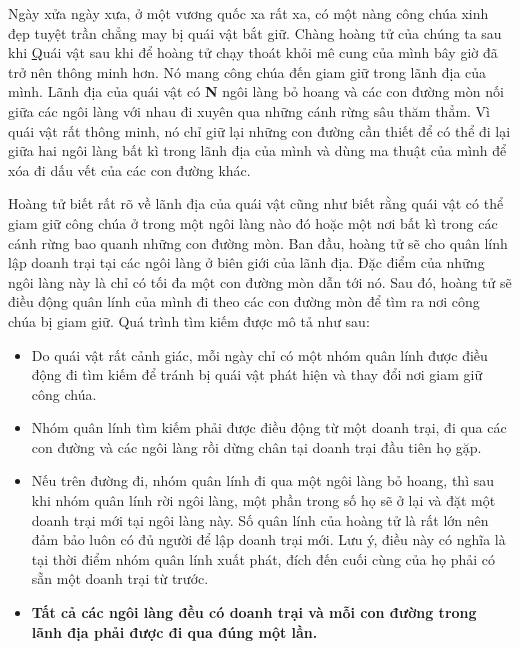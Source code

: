 

Ngày xửa ngày xưa, ở một vương quốc xa rất xa, có một nàng công chúa xinh đẹp tuyệt trần chẳng may bị quái vật bắt giữ. Chàng hoàng tử của chúng ta sau khi \href{vnoi.info/problems/show/VOBOARD2/{ thoát ra được mê cung } chưa bao lâu thì hay tin này và chàng ngay lập tức dẫn quân lính đi giải cứu công chúa. }

Quái vật sau khi để hoàng tử chạy thoát khỏi mê cung của mình bây giờ đã trở nên thông minh hơn. Nó mang công chúa đến giam giữ trong lãnh địa của mình. Lãnh địa của quái vật có \textbf{ N } ngôi làng bỏ hoang và các con đường mòn nối giữa các ngôi làng với nhau đi xuyên qua những cánh rừng sâu thăm thẳm. Vì quái vật rất thông minh, nó chỉ giữ lại những con đường cần thiết để có thể đi lại giữa hai ngôi làng bất kì trong lãnh địa của mình và dùng ma thuật của mình để xóa đi dấu vết của các con đường khác.

Hoàng tử biết rất rõ về lãnh địa của quái vật cũng như biết rằng quái vật có thể giam giữ công chúa ở trong một ngôi làng nào đó hoặc một nơi bất kì trong các cánh rừng bao quanh những con đường mòn. Ban đầu, hoàng tử sẽ cho quân lính lập doanh trại tại các ngôi làng ở biên giới của lãnh địa. Đặc điểm của những ngôi làng này là chỉ có tối đa một con đường mòn dẫn tới nó. Sau đó, hoàng tử sẽ điều động quân lính của mình đi theo các con đường mòn để tìm ra nơi công chúa bị giam giữ. Quá trình tìm kiếm được mô tả như sau:
\begin{itemize}
	\item Do quái vật rất cảnh giác, mỗi ngày chỉ có một nhóm quân lính được điều động đi tìm kiếm để tránh bị quái vật phát hiện và thay đổi nơi giam giữ công chúa.
	\item Nhóm quân lính tìm kiếm phải được điều động từ một doanh trại, đi qua các con đường và các ngôi làng rồi dừng chân tại doanh trại đầu tiên họ gặp.
	\item Nếu trên đường đi, nhóm quân lính đi qua một ngôi làng bỏ hoang, thì sau khi nhóm quân lính rời ngôi làng, một phần trong số họ sẽ ở lại và đặt một doanh trại mới tại ngôi làng này. Số quân lính của hoàng tử là rất lớn nên đảm bảo luôn có đủ người để lập doanh trại mới. Lưu ý, điều này có nghĩa là tại thời điểm nhóm quân lính xuất phát, đích đến cuối cùng của họ phải có sẵn một doanh trại từ trước.
	\item \textbf{Tất cả các ngôi làng đều có doanh trại và mỗi con đường trong lãnh địa phải được đi qua đúng một lần. }
\end{itemize}

